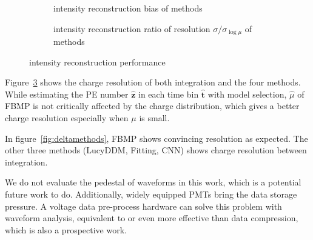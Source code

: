 \begin{figure}[H]
  \begin{subfigure}[b]{\textwidth}
    \centering
    \resizebox{\textwidth}{!}{}
    \caption{\label{fig:biasmu} intensity reconstruction bias of methods}
  \end{subfigure}
  \begin{subfigure}[b]{\textwidth}
    \centering
    \resizebox{\textwidth}{!}{}
    \caption{\label{fig:deltamu} intensity reconstruction ratio of resolution $\sigma/\sigma_{\log\mu}$ of methods}
  \end{subfigure}
  \caption{intensity reconstruction performance}
\end{figure}

Figure~\ref{fig:deltamu} shows the charge resolution of both integration and the four methods. While estimating the PE number $\hat{\bm{z}}$ in each time bin $\hat{\bm{t}}$ with model selection, $\hat{\mu}$ of FBMP is not critically affected by the charge distribution, which gives a better charge resolution especially when $\mu$ is small. 

In figure~\ref{fig:deltamethods}, FBMP shows convincing resolution as expected. The other three methods (LucyDDM, Fitting, CNN) shows charge resolution between integration. 


We do not evaluate the pedestal of waveforms in this work, which is a potential future work to do. Additionally, widely equipped PMTs bring the data storage pressure. A voltage data pre-process hardware can solve this problem with waveform analysis, equivalent to or even more effective than data compression, which is also a prospective work. 
